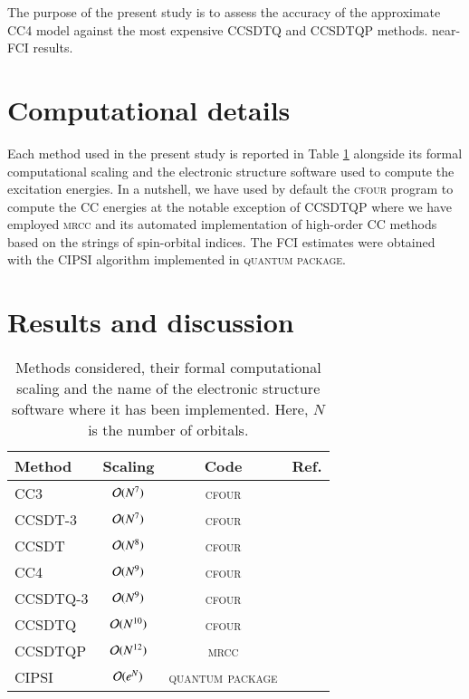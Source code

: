 \documentclass[aip,jcp,reprint,noshowkeys,superscriptaddress]{revtex4-1}
\newcommand{\QP}{\textsc{quantum package}}
\newcommand{\MRCC}{\textsc{mrcc}}
\newcommand{\CFOUR}{\textsc{cfour}}
\begin{document}
The purpose of the present study is to assess the accuracy of the approximate CC4 model against the most expensive CCSDTQ and CCSDTQP methods.
near-FCI results.

\section{Computational details}

Each method used in the present study is reported in Table \ref{tab:scaling} alongside its formal computational scaling and the electronic structure software used to compute the excitation energies.
In a nutshell, we have used by default the {\CFOUR} program to compute the CC energies at the notable exception of CCSDTQP where we have employed {\MRCC} and its automated implementation of high-order CC methods based on the strings of spin-orbital indices.
The FCI estimates were obtained with the CIPSI algorithm implemented in {\QP}.

\section{Results and discussion}

\begin{table}
	\caption{Methods considered, their formal computational scaling and the name of the electronic structure software where it has been implemented.
	Here, $N$ is the number of orbitals.
	\label{tab:scaling}}
	\begin{ruledtabular}
	\begin{tabular}{lccc}
		Method	&	Scaling					&	Code		&	Ref.					\\
		\hline
		CC3			&	$\order*{N^{7}}$	&	\CFOUR		&	\onlinecite{cfour}		\\
		CCSDT-3		&	$\order*{N^{7}}$	&	\CFOUR		&	\onlinecite{cfour}		\\
		CCSDT		&	$\order*{N^{8}}$	&	\CFOUR		&	\onlinecite{cfour}		\\
		CC4			&	$\order*{N^{9}}$	&	\CFOUR		&	\onlinecite{cfour}		\\
		CCSDTQ-3	&	$\order*{N^{9}}$	&	\CFOUR		&	\onlinecite{cfour}		\\
		CCSDTQ		&	$\order*{N^{10}}$	&	\CFOUR		&	\onlinecite{cfour}		\\
		CCSDTQP		&	$\order*{N^{12}}$	&	\MRCC		&	\onlinecite{mrcc}		\\	
		CIPSI		&	$\order*{e^{N}}$	&	\QP			&	\onlinecite{qp2}		\\
	\end{tabular}
	\end{ruledtabular}
\end{table}
\end{document}
